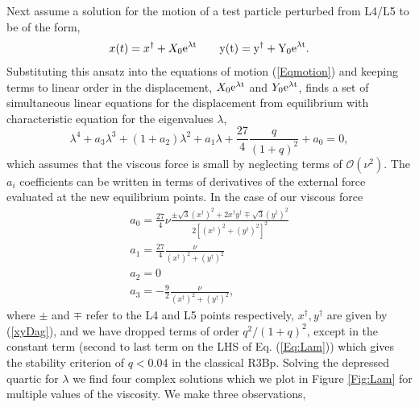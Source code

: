 Next assume a solution for the motion of a test particle perturbed
from L4/L5 to be of the form,
\begin{equation}
\label{ansatz}
x(t) = x^{\dagger} + X_0 \rm{e}^{\lambda t} \qquad y(t) = y^{\dagger} + Y_0 \rm{e}^{\lambda t}.
\end{equation}
Substituting this ansatz into the equations of motion (\ref{Eqmotion})
and keeping terms to linear order in the displacement,
$X_0\rm{e}^{\lambda t}$ and $Y_0\rm{e}^{\lambda t}$,
\cite{Murray:1994} finds a set of simultaneous linear equations for
the displacement from equilibrium with characteristic equation for the
eigenvalues $\lambda$,
\begin{equation}
\lambda^4 + a_3 \lambda^3  + (1+a_2)\lambda^2 + a_1 \lambda + \frac{27}{4}\frac{q}{(1+q)^2} + a_0 = 0,
\label{Eq:Lam}
\end{equation}
which assumes that the viscous force is small by neglecting terms of
$\mathcal{O}(\nu^2)$.  The $a_i$ coefficients can be written in terms
of derivatives of the external force evaluated at the new equilibrium
points. In the case of our viscous force
\begin{equation}
\begin{array}{l}
a_0 =  \frac{27}{4}\nu\frac{ \pm \sqrt{3} (x^{\dagger})^2 + 2 x^{\dagger} y^{\dagger} \mp \sqrt{3} (y^{\dagger})^2 }{2  \left[(x^{\dagger})^2  +   (y^{\dagger})^2\right]^2}   \nonumber \\
%
a_1 =  \frac{27}{4}\frac{\nu }{ (x^{\dagger})^2  +    (y^{\dagger})^2}  \nonumber \\
%
a_2 = 0   \nonumber \\
%
a_3 =  - \frac{9}{2}\frac{\nu }{ (x^{\dagger})^2  +    (y^{\dagger})^2},
\end{array}
\end{equation}
where $\pm$ and $\mp$ refer to the L4 and L5 points respectively,
$x^{\dagger}, y^{\dagger}$ are given by (\ref{xyDag}), and we have
dropped terms of order $q^2/(1+q)^2$, except in the constant term
(second to last term on the LHS of Eq. (\ref{Eq:Lam})) which gives the
stability criterion of $q<0.04$ in the classical R3Bp. Solving the
depressed quartic for $\lambda$ we find four complex solutions
which we plot in Figure \ref{Fig:Lam} for multiple values of the
viscosity. We make three observations, 
